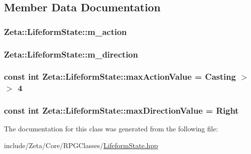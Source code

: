 \subsection{Member Data Documentation}
\hypertarget{classZeta_1_1LifeformState_ae7fa763bada25f73ce0eb41995600ce1}{
\subsubsection[{m\+\_\+action}]{ Zeta\+::\+Lifeform\+State\+::m\+\_\+action\hspace{0.3cm}{\ttfamily [private]}}}\label{classZeta_1_1LifeformState_ae7fa763bada25f73ce0eb41995600ce1}
\hypertarget{classZeta_1_1LifeformState_a9d68e33fdffc2a4b3c9aded59895041f}{
\subsubsection[{m\+\_\+direction}]{ Zeta\+::\+Lifeform\+State\+::m\+\_\+direction\hspace{0.3cm}{\ttfamily [private]}}}\label{classZeta_1_1LifeformState_a9d68e33fdffc2a4b3c9aded59895041f}
\hypertarget{classZeta_1_1LifeformState_a89d30f2c8086821c2d0346fcf867f473}{
\subsubsection[{max\+Action\+Value}]{\setlength{\rightskip}{0pt plus 5cm}const int Zeta\+::\+Lifeform\+State\+::max\+Action\+Value = {\bf Casting} $>$$>$ 4\hspace{0.3cm}{\ttfamily [static]}}}\label{classZeta_1_1LifeformState_a89d30f2c8086821c2d0346fcf867f473}
\hypertarget{classZeta_1_1LifeformState_a1d7a962e39e64266d685cce63e94774f}{
\subsubsection[{max\+Direction\+Value}]{\setlength{\rightskip}{0pt plus 5cm}const int Zeta\+::\+Lifeform\+State\+::max\+Direction\+Value = {\bf Right}\hspace{0.3cm}{\ttfamily [static]}}}\label{classZeta_1_1LifeformState_a1d7a962e39e64266d685cce63e94774f}


The documentation for this class was generated from the following file\+:\begin{DoxyCompactItemize}
\item 
include/\+Zeta/\+Core/\+R\+P\+G\+Classes/\hyperlink{LifeformState_8hpp}{Lifeform\+State.\+hpp}\end{DoxyCompactItemize}
